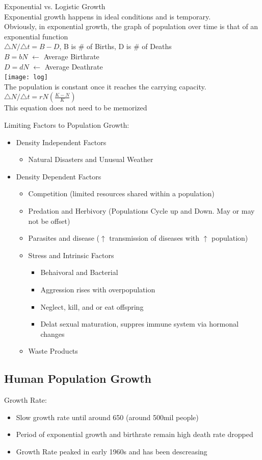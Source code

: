 \documentclass{article}
\begin{document}
Exponential vs. Logistic Growth\\
Exponential growth happens in ideal conditions and is temporary.\\
Obviously, in exponential growth, the graph of population over time is that of an exponential function\\
${\triangle N}/{\triangle t}=B-D$, B is \# of Births, D is \# of Deaths\\
$B=bN$ $\leftarrow$ Average Birthrate\\
$D=dN$ $\leftarrow$ Average Deathrate\\
\texttt{[image: log]}\\
The population is constant once it reaches the carrying capacity.\\
${\triangle N}/{\triangle t}=rN(\frac{K-N}{K})$\\
This equation does not need to be memorized

Limiting Factors to Population Growth:
\begin{itemize}
\item Density Independent Factors
\begin{itemize}
\item Natural Disasters and Unusual Weather
\end{itemize}
\item Density Dependent Factors
\begin{itemize}
\item Competition (limited resources shared within a population)
\item Predation and Herbivory (Populations Cycle up and Down. May or may not be offset)
\item Parasites and disease ($\uparrow$ transmission of diseases with $\uparrow$ population)
\item Stress and Intrinsic Factors
\begin{itemize}
\item Behaivoral and Bacterial
\item Aggression rises with overpopulation
\item Neglect, kill, and or eat offspring
\item Delat sexual maturation, suppres immune system via hormonal changes
\end{itemize}
\item Waste Products
\end{itemize}
\end{itemize}

\subsection{Human Population Growth}
Growth Rate:
\begin{itemize}
\item Slow growth rate until around 650 (around 500mil people)
\item Period of exponential growth and birthrate remain high death rate dropped
\item Growth Rate peaked in early 1960s and has been descreasing
\end{itemize}
\end{document}
